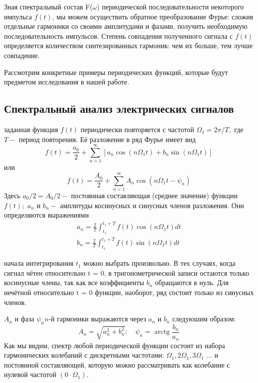 \documentclass[a4paper,12pt]{article} %
\begin{document}
\hfill \break
Зная спектральный состав F($\omega$) периодической последовательности некоторого импульса $f(t)$, мы можем осуществить обратное преобразование Фурье: сложив отдельные гармоники со своими амплитудами и фазами, получить необходимую последовательность импульсов. Степень совпадения полученного сигнала с $f(t)$ определяется количеством синтезированных гармоник: чем их больше, тем лучше совпадение.

\hfill \break
Рассмотрим конкретные примеры периодических функций, которые будут предметом исследования в нашей работе.
\hfill \break
\subsection{Спектральный анализ электрических сигналов}

\hfill {} заданная функция $f(t)$ периодически повторяется с частотой $\Omega_{1}=2 \pi / T,$ где $T-$ период повторения. Её разложение в ряд Фурье имеет вид
$$
f(t)=\frac{a_{0}}{2}+\sum_{n=1}^{\infty}\left[a_{n} \cos \left(n \Omega_{1} t\right)+b_{n} \sin \left(n \Omega_{1} t\right)\right]
$$
или
$$
f(t)=\frac{A_{0}}{2}+\sum_{n=1}^{\infty} A_{n} \cos \left(n \Omega_{1} t-\psi_{n}\right)
$$
Здесь $a_{0} / 2=A_{0} / 2 - $ постоянная составляющая (среднее значение) функции $f(t) ;$ $a_{n}$ и $b_{n}-$ амплитуды косинусных и синусных членов разложения. Они определяются выражениями
$$
\begin{array}{l}
a_{n}=\frac{2}{T} \int_{t_{1}}^{t_{1}+T} f(t) \cos \left(n \Omega_{1} t\right) d t \\
b_{n}=\frac{2}{T} \int_{t_{1}}^{t_{1}+T} f(t) \sin \left(n \Omega_{1} t\right) d t
\end{array}
$$

\hfill {} начала интегрирования $t_1$ можно выбрать произвольно.
В тех случаях, когда сигнал чётен относительно t = 0, в тригонометрической записи остаются только косинусные члены, так как все коэффициенты $b_n$ обращаются в нуль. Для нечётной относительно t = 0 функции, наоборот, ряд состоит только из синусных членов.

\hfill {} $A_{n}$ и фаза $\psi_{n}  n$-й гармоники выражаются через $a_{n}$ и $b_{n}$ следуюшим образом:
$$
A_{n}=\sqrt{a_{n}^{2}+b_{n}^{2}} ; \quad \psi_{n}=\operatorname{arctg} \frac{b_{n}}{a_{n}}
$$
Как мы видим, спектр любой периодической функции состоит из набора гармонических колебаний с дискретными частотами: $\Omega_{1}, 2 \Omega_{1}, 3 \Omega_{1}$ $\ldots$ и постоянной составляющей, которую можно рассматривать как колебание с нулевой частотой $\left(0 \cdot \Omega_{1}\right) .$
\end{document}
